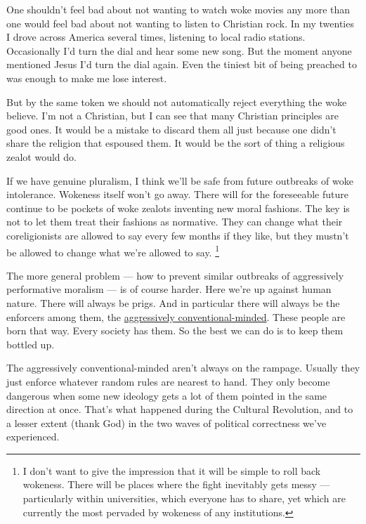 \documentclass[12pt]{book}
\begin{document}
One shouldn't feel bad about not wanting to watch woke movies any more
than one would feel bad about not wanting to listen to Christian rock.
In my twenties I drove across America several times, listening to local
radio stations. Occasionally I'd turn the dial and hear some new song.
But the moment anyone mentioned Jesus I'd turn the dial again. Even the
tiniest bit of being preached to was enough to make me lose interest.

But by the same token we should not automatically reject everything the
woke believe. I'm not a Christian, but I can see that many Christian
principles are good ones. It would be a mistake to discard them all just
because one didn't share the religion that espoused them. It would be
the sort of thing a religious zealot would do.

If we have genuine pluralism, I think we'll be safe from future
outbreaks of woke intolerance. Wokeness itself won't go away. There will
for the foreseeable future continue to be pockets of woke zealots
inventing new moral fashions. The key is not to let them treat their
fashions as normative. They can change what their coreligionists are
allowed to say every few months if they like, but they mustn't be
allowed to change what we're allowed to say. \footnote{I don't want to give the impression that it will be simple to
roll back wokeness. There will be places where the fight inevitably gets
messy --- particularly within universities, which everyone has to share,
yet which are currently the most pervaded by wokeness of any
institutions.}

The more general problem --- how to prevent similar outbreaks of
aggressively performative moralism --- is of course harder. Here we're
up against human nature. There will always be prigs. And in particular
there will always be the enforcers among them, the
\href{conformism.html}{aggressively conventional-minded}. These people
are born that way. Every society has them. So the best we can do is to
keep them bottled up.

The aggressively conventional-minded aren't always on the rampage.
Usually they just enforce whatever random rules are nearest to hand.
They only become dangerous when some new ideology gets a lot of them
pointed in the same direction at once. That's what happened during the
Cultural Revolution, and to a lesser extent (thank God) in the two waves
of political correctness we've experienced.
\end{document}
